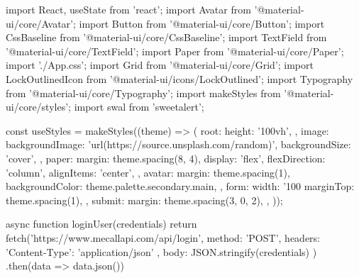 import React, { useState } from 'react';
import Avatar from '@material-ui/core/Avatar';
import Button from '@material-ui/core/Button';
import CssBaseline from '@material-ui/core/CssBaseline';
import TextField from '@material-ui/core/TextField';
import Paper from '@material-ui/core/Paper';
import './App.css';
import Grid from '@material-ui/core/Grid';
import LockOutlinedIcon from '@material-ui/icons/LockOutlined';
import Typography from '@material-ui/core/Typography';
import { makeStyles } from '@material-ui/core/styles';
import swal from 'sweetalert';

const useStyles = makeStyles((theme) => ({
  root: {
    height: '100vh',
  },
  image: {
    backgroundImage: 'url(https://source.unsplash.com/random)',
    backgroundSize: 'cover',
  },
  paper: {
    margin: theme.spacing(8, 4),
    display: 'flex',
    flexDirection: 'column',
    alignItems: 'center',
  },
  avatar: {
    margin: theme.spacing(1),
    backgroundColor: theme.palette.secondary.main,
  },
  form: {
    width: '100%
    marginTop: theme.spacing(1),
  },
  submit: {
    margin: theme.spacing(3, 0, 2),
  },
}));

async function loginUser(credentials) {
  return fetch('https://www.mecallapi.com/api/login', {
    method: 'POST',
    headers: {
      'Content-Type': 'application/json'
    },
    body: JSON.stringify(credentials)
  })
    .then(data => data.json())
 }

